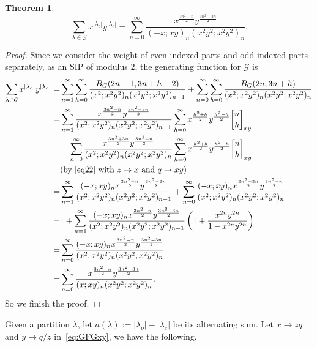 \documentclass[12pt]{amsart}
\newtheorem{theorem}{Theorem}[section]
\theoremstyle{definition}
\theoremstyle{remark}
\numberwithin{equation}{section}
\begin{document}
\begin{theorem}\label{thm:GFGxy}
\begin{equation}\label{eq:GFGxy}
\sum_{\lambda\in\mathcal{G}}x^{|\lambda_{o}|}y^{|\lambda_{e}|}=\sum_{n=0}^{\infty}\frac{x^{\frac{3n^2-n}{2}}y^{\frac{3n^2-3n}{2}}}{(-x;xy)_n(x^2y^2;x^2y^2)_{n}}.
\end{equation}
\end{theorem}

\begin{proof}
Since we consider the weight of even-indexed parts and odd-indexed parts separately, as an SIP of modulus $2$, the generating function for $\mathcal{G}$ is
\begin{align*}
\sum_{\lambda\in\mathcal{G}}x^{|\lambda_{o}|}y^{|\lambda_{e}|}=&\sum_{n=1}^{\infty}\sum_{h=0}^{\infty}\frac{B_G(2n-1,3n+h-2)}{(x^2;x^2y^2)_n(x^2y^2;x^2y^2)_{n-1}}+\sum_{n=0}^{\infty}\sum_{h=0}^{\infty}\frac{B_G(2n,3n+h)}{(x^2;x^2y^2)_n(x^2y^2;x^2y^2)_{n}}\\
=&\sum_{n=1}^{\infty}\frac{x^{\frac{3n^2-n}{2}}y^{\frac{3n^2-3n}{2}}}{(x^2;x^2y^2)_n(x^2y^2;x^2y^2)_{n-1}}\sum_{h=0}^{\infty}x^{\frac{h^2+h}{2}}y^{\frac{h^2-h}{2}}{n\brack h}_{xy}\\
&+\sum_{n=0}^{\infty}\frac{x^{\frac{3n^2+3n}{2}}y^{\frac{3n^2+n}{2}}}{(x^2;x^2y^2)_n(x^2y^2;x^2y^2)_{n}}\sum_{h=0}^{\infty}x^{\frac{h^2+h}{2}}y^{\frac{h^2-h}{2}}{n\brack h}_{xy}\\
&\text{(by~\eqref{eq22} with $z\to x$ and $q\to xy$)}\\
=&\sum_{n=1}^{\infty}\frac{(-x;xy)_{n}x^{\frac{3n^2-n}{2}}y^{\frac{3n^2-3n}{2}}}{(x^2;x^2y^2)_n(x^2y^2;x^2y^2)_{n-1}}+\sum_{n=0}^{\infty}\frac{(-x;xy)_{n}x^{\frac{3n^2+3n}{2}}y^{\frac{3n^2+n}{2}}}{(x^2;x^2y^2)_n(x^2y^2;x^2y^2)_{n}}\\
=&1+\sum_{n=1}^{\infty}\frac{(-x;xy)_{n}x^{\frac{3n^2-n}{2}}y^{\frac{3n^2-3n}{2}}}{(x^2;x^2y^2)_n(x^2y^2;x^2y^2)_{n-1}}\left(1+\frac{x^{2n}y^{2n}}{1-x^{2n}y^{2n}}\right)\\
=&\sum_{n=0}^{\infty}\frac{(-x;xy)_{n}x^{\frac{3n^2-n}{2}}y^{\frac{3n^2-3n}{2}}}{(x^2;x^2y^2)_n(x^2y^2;x^2y^2)_{n}}\\
=&\sum_{n=0}^{\infty}\frac{x^{\frac{3n^2-n}{2}}y^{\frac{3n^2-3n}{2}}}{(x;xy)_n(x^2y^2;x^2y^2)_{n}}.
\end{align*}
So we finish the proof.
\end{proof}
Given a partition $\lambda$, let $a(\lambda):=|\lambda_{o}|-|\lambda_{e}|$ be its alternating sum. Let $x\to zq$ and $y\to q/z$ in~\eqref{eq:GFGxy}, we have the following.
\end{document}
